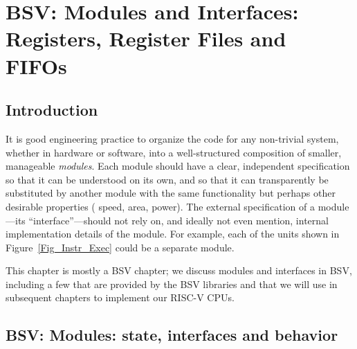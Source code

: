 

\chapter{BSV: Modules and Interfaces: Registers, Register Files and FIFOs}


\setcounter{page}{1}
\renewcommand{\thepage}{\arabic{chapter}-\arabic{page}}

\label{ch_Modules_and_Interfaces}


\section{Introduction}

It is good engineering practice to organize the code for any
non-trivial system, whether in hardware or software, into a
well-structured composition of smaller, manageable \emph{modules}.
Each module should have a clear, independent specification so that it
can be understood on its own, and so that it can transparently be
substituted by another module with the same functionality but perhaps
other desirable properties ({\eg} speed, area, power).  The external
specification of a module---its ``interface''---should not rely on,
and ideally not even mention, internal implementation details of the
module.  For example, each of the units shown in
Figure~\ref{Fig_Instr_Exec} could be a separate module.

This chapter is mostly a BSV chapter; we discuss modules and
interfaces in BSV, including a few that are provided by the BSV
libraries and that we will use in subsequent chapters to implement our
RISC-V CPUs.


\section{BSV: Modules: state, interfaces and behavior}

\label{Sec_Modules}


